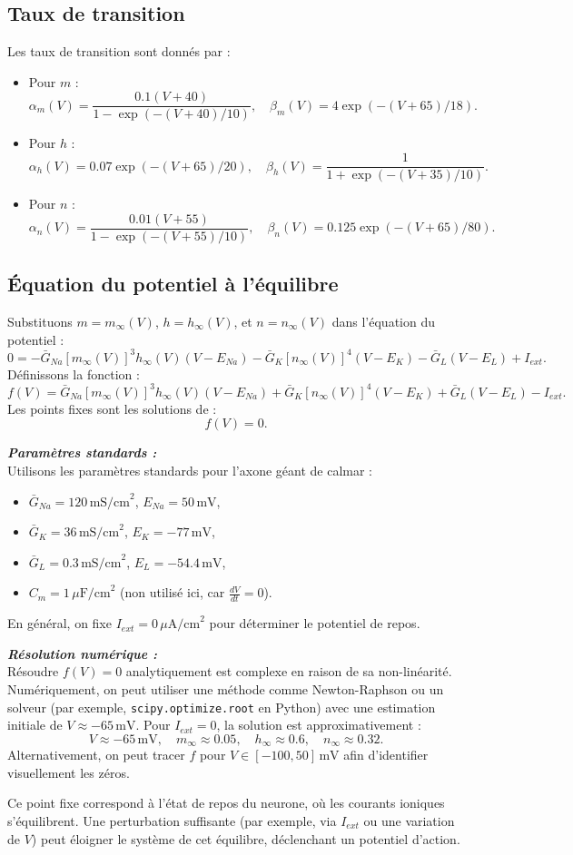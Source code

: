 \subsection{Taux de transition}
\small
Les taux de transition sont donnés par :
\begin{itemize}
	\item Pour \( m \) :
	\[
	\alpha_m(V) = \frac{0.1 (V + 40)}{1 - \exp(-(V + 40)/10)}, \quad \beta_m(V) = 4 \exp(-(V + 65)/18).
	\]
	\item Pour \( h \) :
	\[
	\alpha_h(V) = 0.07 \exp(-(V + 65)/20), \quad \beta_h(V) = \frac{1}{1 + \exp(-(V + 35)/10)}.
	\]
	\item Pour \( n \) :
	\[
	\alpha_n(V) = \frac{0.01 (V + 55)}{1 - \exp(-(V + 55)/10)}, \quad \beta_n(V) = 0.125 \exp(-(V + 65)/80).
	\]
\end{itemize}

\subsection{Équation du potentiel à l'équilibre}
\small
Substituons \( m = m_\infty(V) \), \( h = h_\infty(V) \), et \( n = n_\infty(V) \) dans l'équation du potentiel :
\[
0 = -\bar{G}_{Na} [m_\infty(V)]^3 h_\infty(V) (V - E_{Na}) - \bar{G}_K [n_\infty(V)]^4 (V - E_K) - \bar{G}_L (V - E_L) + I_{ext}.
\]
Définissons la fonction :
\[
f(V) = \bar{G}_{Na} [m_\infty(V)]^3 h_\infty(V) (V - E_{Na}) + \bar{G}_K [n_\infty(V)]^4 (V - E_K) + \bar{G}_L (V - E_L) - I_{ext}.
\]
Les points fixes sont les solutions de :
\[
f(V) = 0.
\]

\textbf{\textit{Paramètres standards :}}\\
Utilisons les paramètres standards pour l'axone géant de calmar :
\begin{itemize}
	\item \( \bar{G}_{Na} = 120 \, \text{mS/cm}^2 \), \( E_{Na} = 50 \, \text{mV} \),
	\item \( \bar{G}_K = 36 \, \text{mS/cm}^2 \), \( E_K = -77 \, \text{mV} \),
	\item \( \bar{G}_L = 0.3 \, \text{mS/cm}^2 \), \( E_L = -54.4 \, \text{mV} \),
	\item \( C_m = 1 \, \mu\text{F/cm}^2 \) (non utilisé ici, car \( \frac{dV}{dt} = 0 \)).
\end{itemize}
En général, on fixe \( I_{ext} = 0 \, \mu\text{A/cm}^2 \) pour déterminer le potentiel de repos.

\textbf{\textit{Résolution numérique :}}\\
Résoudre \( f(V) = 0 \) analytiquement est complexe en raison de sa non-linéarité. Numériquement, on peut utiliser une méthode comme Newton-Raphson ou un solveur (par exemple, \texttt{scipy.optimize.root} en Python) avec une estimation initiale de \( V \approx -65 \, \text{mV} \). Pour \( I_{ext} = 0 \), la solution est approximativement :
\[
V \approx -65 \, \text{mV}, \quad m_\infty \approx 0.05, \quad h_\infty \approx 0.6, \quad n_\infty \approx 0.32.
\]
Alternativement, on peut tracer \( f \) pour \( V \in [-100, 50] \, \text{mV} \) afin d'identifier visuellement les zéros.

Ce point fixe correspond à l'état de repos du neurone, où les courants ioniques s'équilibrent. Une perturbation suffisante (par exemple, via \( I_{ext} \) ou une variation de \( V \)) peut éloigner le système de cet équilibre, déclenchant un potentiel d'action.